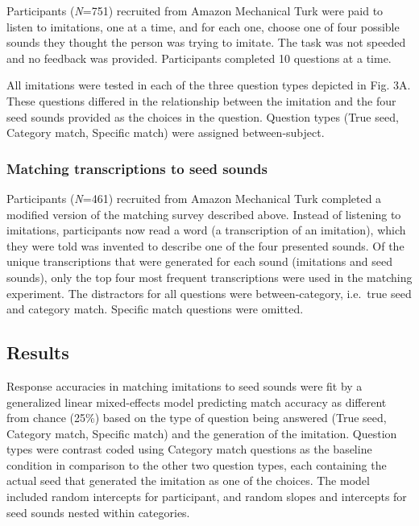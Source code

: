 \documentclass[english,floatsintext,man]{apa6}
\theoremstyle{definition}
\theoremstyle{definition}
\theoremstyle{definition}
\theoremstyle{remark}
\begin{document}
Participants (\emph{N}=751) recruited from Amazon Mechanical Turk were
paid to listen to imitations, one at a time, and for each one, choose
one of four possible sounds they thought the person was trying to
imitate. The task was not speeded and no feedback was provided.
Participants completed 10 questions at a time.

All imitations were tested in each of the three question types depicted
in Fig. 3A. These questions differed in the relationship between the
imitation and the four seed sounds provided as the choices in the
question. Question types (True seed, Category match, Specific match)
were assigned between-subject.

\hypertarget{matching-transcriptions-to-seed-sounds}{%
\subsubsection{Matching transcriptions to seed
sounds}\label{matching-transcriptions-to-seed-sounds}}

Participants (\emph{N}=461) recruited from Amazon Mechanical Turk
completed a modified version of the matching survey described above.
Instead of listening to imitations, participants now read a word (a
transcription of an imitation), which they were told was invented to
describe one of the four presented sounds. Of the unique transcriptions
that were generated for each sound (imitations and seed sounds), only
the top four most frequent transcriptions were used in the matching
experiment. The distractors for all questions were between-category,
i.e.~true seed and category match. Specific match questions were
omitted.

\hypertarget{results-1}{%
\subsection{Results}\label{results-1}}

Response accuracies in matching imitations to seed sounds were fit by a
generalized linear mixed-effects model predicting match accuracy as
different from chance (25\%) based on the type of question being
answered (True seed, Category match, Specific match) and the generation
of the imitation. Question types were contrast coded using Category
match questions as the baseline condition in comparison to the other two
question types, each containing the actual seed that generated the
imitation as one of the choices. The model included random intercepts
for participant, and random slopes and intercepts for seed sounds nested
within categories.
\end{document}
